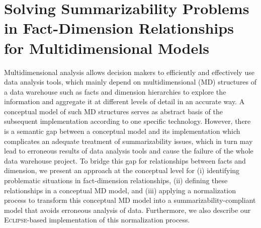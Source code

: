 %
%
%




\chapter{Solving Summarizability Problems in Fact-Dimension Relationships for Multidimensional Models}
\label{a3} %



Multidimensional analysis allows decision makers to
effi\-ci\-ent\-ly and effectively use data analysis tools, which
mainly depend on multidimensional (MD) structures of a data
warehouse such as facts and dimension hierarchies to explore the
information and aggregate it at different levels of detail in an
accurate way. A conceptual model of such MD structures serves as
abstract basis of the subsequent implementation according to one
specific technology. However, there is a semantic gap between a
conceptual model and its implementation which complicates an
adequate treatment of summarizability issues, which in turn may lead
to erroneous results of data analysis tools and cause the failure of
the whole data warehouse project.  To bridge this gap for
relationships between facts and dimension, we present an approach at
the conceptual level for (i) identifying problematic situations in
fact-dimension relationships, (ii) defining these relationships in a
conceptual MD model, and (iii) applying a normalization process to
transform this conceptual MD model into a summarizability-compliant
model that avoids erroneous analysis of data. Furthermore, we also
describe our \textsc{Eclipse}-based implementation of this
normalization process.


